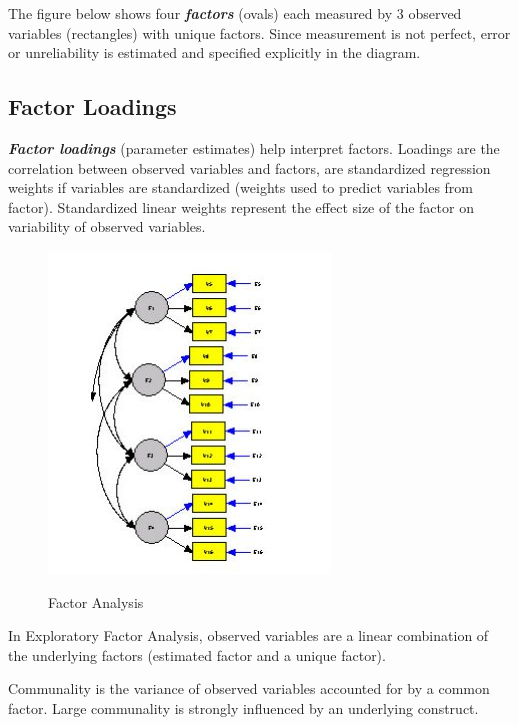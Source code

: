 \documentclass[a4paper,12pt]{article}
\begin{document}
The figure below shows four \textbf{\emph{factors}} (ovals) each measured by 3 observed variables (rectangles) with unique factors. Since measurement is not perfect, error or unreliability is estimated and specified explicitly in the diagram.

\subsection*{Factor Loadings}
\textbf{\emph{Factor loadings}} (parameter estimates) help interpret factors. Loadings are the correlation between observed variables and factors, are standardized regression weights if variables are standardized (weights used to predict variables from factor). Standardized linear weights represent the effect size of the factor
on variability of observed variables.

\begin{figure}[h!]
\begin{center}
  \includegraphics[scale=0.6]{4AFactor.jpg}\\
  \caption{Factor Analysis}
\end{center}
\end{figure}

In Exploratory Factor Analysis, observed variables are a linear combination of the underlying factors (estimated factor and a unique factor).

Communality is the variance of observed variables accounted for by a common factor. Large communality is strongly
influenced by an underlying construct.
\end{document}
